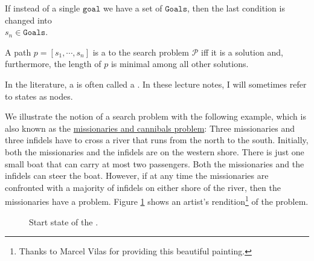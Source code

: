 \begin{Definition}
\begin{enumerate}
        If instead of a single $\texttt{goal}$ we have a set of $\texttt{Goals}$, then the last condition
        is changed into
        \\[0.2cm]
        \hspace*{1.3cm}
        $s_n \in \mathtt{Goals}$.
  \end{enumerate}
  A path $p = [s_1, \cdots, s_n]$ is a  to the search problem $\mathcal{P}$
  iff it is a solution and, furthermore, the length of $p$ is minimal among all other solutions. \eoxs
\end{Definition}

\remark
In the literature, a  is often called a .  
In these lecture notes, I will sometimes refer to states as nodes.  \eoxs

\example
We illustrate the notion of a search problem with the following example, which is also known as the
\href{https://en.wikipedia.org/wiki/Missionaries_and_cannibals_problem}{missionaries and cannibals problem}:
Three missionaries and three infidels have to cross a river that runs from the north to the south.
Initially, both the missionaries and the infidels are on the western shore.  There is just one small boat 
that can carry at most two passengers.  Both the missionaries and the infidels can steer the boat.
However, if at any time the missionaries are confronted with a majority of infidels on either shore of the
river, then the missionaries have a problem.  Figure \ref{fig:missionaries-and-infidels.pdf} shows an 
artist's rendition\footnote{Thanks to Marcel Vilas for providing this beautiful painting.}
of the problem.

\begin{figure}[!ht]
  \centering
  \caption{Start state of the .}
  \label{fig:missionaries-and-infidels.pdf}
\end{figure}


